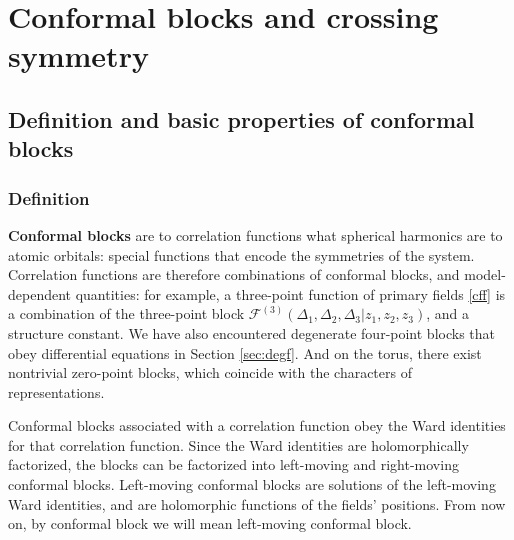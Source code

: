 \documentclass[12pt, a4paper, notitlepage, twoside]{report}
\numberwithin{equation}{section}
\theoremstyle{break}
\begin{document}
\section{Conformal blocks and crossing symmetry \label{secaco}}

\subsection{Definition and basic properties of conformal blocks}

\subsubsection{Definition}

\textbf{\boldmath Conformal blocks} are to correlation functions what spherical harmonics are to atomic orbitals: special functions that encode the symmetries of the system.
Correlation functions are therefore combinations of conformal blocks, and model-dependent quantities: for example, a three-point function of primary fields \eqref{cff} is a combination of 
the three-point block $\mathcal{F}^{(3)}(\Delta_1,\Delta_2,\Delta_3|z_1,z_2,z_3)$, and a structure constant.
We have also encountered degenerate four-point blocks that obey differential equations in Section \ref{sec:degf}.
And on the torus, there exist nontrivial zero-point blocks, which coincide with the characters of representations. 

Conformal blocks associated with a correlation function obey the Ward identities for that correlation function. 
Since the Ward identities are holomorphically factorized, the blocks can be factorized into left-moving and right-moving conformal blocks. Left-moving conformal blocks are solutions of the left-moving Ward identities, and are holomorphic functions of the fields' positions. From now on, by conformal block we will mean left-moving conformal block. 
\end{document}
